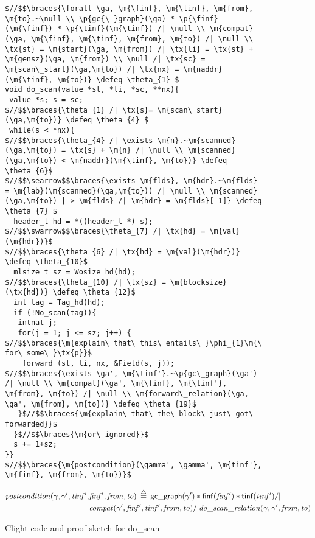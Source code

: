\renewcommand{\tx}[1]{\scriptsize {\text{#1}}}

\begin{figure}[t]
\vspace{-1ex}
  \begin{lstlisting}[multicols = 2]
$//$$\braces{\forall \ga, \m{\finf}, \m{\tinf}, \m{from}, \m{to}.~\null \\ \p{gc{\_}graph}(\ga) * \p{\finf}(\m{\finf}) * \p{\tinf}(\m{\tinf}) /| \null \\ \m{compat}(\ga, \m{\finf}, \m{\tinf}, \m{from}, \m{to}) /| \null \\ \tx{st} = \m{start}(\ga, \m{from}) /| \tx{li} = \tx{st} + \m{gensz}(\ga, \m{from}) \\ \null /| \tx{sc} = \m{scan\_start}(\ga,\m{to}) /| \tx{nx} = \m{naddr}(\m{\tinf}, \m{to})} \defeq \theta_{1} $
void do_scan(value *st, *li, *sc, **nx){
 value *s; s = sc;
$//$$\braces{\theta_{1} /| \tx{s}= \m{scan\_start}(\ga,\m{to})} \defeq \theta_{4} $
 while(s < *nx){
$//$$\braces{\theta_{4} /| \exists \m{n}.~\m{scanned}(\ga,\m{to}) = \tx{s} + \m{n} /| \null \\ \m{scanned}(\ga,\m{to}) < \m{naddr}(\m{\tinf}, \m{to})} \defeq \theta_{6}$
$//$$\searrow$$\braces{\exists \m{flds}, \m{hdr}.~\m{flds} = \m{lab}(\m{scanned}(\ga,\m{to})) /| \null \\ \m{scanned}(\ga,\m{to}) |-> \m{flds} /| \m{hdr} = \m{flds}[-1]} \defeq \theta_{7} $
  header_t hd = *((header_t *) s);
$//$$\swarrow$$\braces{\theta_{7} /| \tx{hd} = \m{val}(\m{hdr})}$
$//$$\braces{\theta_{6} /| \tx{hd} = \m{val}(\m{hdr})} \defeq \theta_{10}$
  mlsize_t sz = Wosize_hd(hd);
$//$$\braces{\theta_{10} /| \tx{sz} = \m{blocksize}(\tx{hd})} \defeq \theta_{12}$
  int tag = Tag_hd(hd);
  if (!No_scan(tag)){
   intnat j;
   for(j = 1; j <= sz; j++) {
$//$$\braces{\m{explain\ that\ this\ entails\ }\phi_{1}\m{\ for\ some\ }\tx{p}}$
    forward (st, li, nx, &Field(s, j)); 
$//$$\braces{\exists \ga', \m{\tinf'}.~\p{gc\_graph}(\ga') /| \null \\ \m{compat}(\ga', \m{\finf}, \m{\tinf'}, \m{from}, \m{to}) /| \null \\ \m{forward\_relation}(\ga, \ga', \m{from}, \m{to})} \defeq \theta_{19}$
   }$//$$\braces{\m{explain\ that\ the\ block\ just\ got\ forwarded}}$
  }$//$$\braces{\m{or\ ignored}}$
  s += 1+sz;
}}
$//$$\braces{\m{postcondition}(\gamma', \gamma', \m{tinf'}, \m{finf}, \m{from}, \m{to})}$
\end{lstlisting}
\footnotesize{
\vspace{-0.8em}
\begin{equation*}
\begin{split}
\m{postcondition}(\gamma, \ga', \m{tinf'}, &\m{finf'}, \m{from}, \m{to}) \; \defeq \; 
   \p{gc{\_}graph}(\ga') * \p{\finf}(\m{\finf'}) * \p{\tinf}(\m{\tinf'}) /| \null \\
   &\m{compat}(\ga', \m{\finf'}, \m{\tinf'}, \m{from}, \m{to}) /|
   \m{do\_scan\_relation}(\ga, \ga', \m{from}, \m{to})
\end{split}
\end{equation*}

}
\vspace{-0.4em}
\caption{Clight code and proof sketch for do\_scan}
\label{fig:doscan}
\vspace{-1em}
\end{figure}

\renewcommand{\tx}[1]{\text{#1}}
